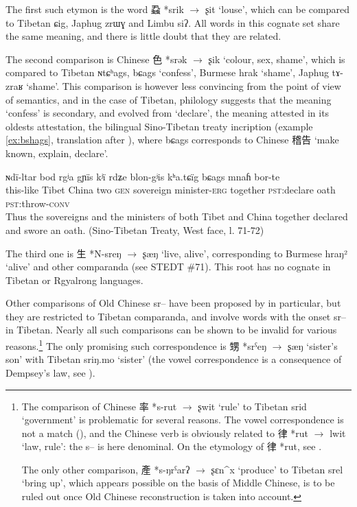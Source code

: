 \documentclass[oldfontcommands,oneside,a4paper,11pt]{article}
\newcommand{\ipa}[1]{{\phon #1}} %
\newcommand{\zh}[1]{{\cn #1}}
\newcommand{\archaic}[4]{\zh{#1} *\ipa{#2} $\rightarrow$ \ipa{#3} `#4'}
\begin{document}
The first such etymon is the word \archaic{蝨}{srik}{ʂit}{louse}, which can be compared to Tibetan \ipa{ɕig}, Japhug \ipa{zrɯɣ} and Limbu \ipa{siʔ}. All words in this cognate set share the same meaning, and there is little doubt that they are related.

The second comparison is Chinese \archaic{色}{srək}{ʂik}{colour, sex, shame}, which is compared to Tibetan \ipa{ɴtɕʰags}, \ipa{bɕags} `confess', Burmese \ipa{hrak} `shame', Japhug \ipa{tɤ-zraʁ} `shame'. This comparison is however less convincing from the point of view of semantics, and in the case of Tibetan, philology suggests that the meaning `confess' is secondary, and evolved from `declare', the meaning attested in its oldests attestation, the bilingual Sino-Tibetan treaty incription (example \ref{ex:bshags}, translation after \citealt[40,80]{licoblin87}), where 	\ipa{bɕags} corresponds to Chinese \zh{稽告} `make known, explain, declare'.


\begin{exe}
\ex \label{ex:bshags}
\gll
\ipa{ɴdï-ltar} 	\ipa{bod} 	\ipa{rgʲa} 	\ipa{gɲïs} 	\ipa{kʲï} 	\ipa{rdʑe} \ipa{blon-gʲis} 	\ipa{kʰa.tɕïg} 	\ipa{bɕags} 	\ipa{mnaɦ} 	\ipa{bor-te} \\
this-like Tibet China two \textsc{gen} sovereign minister-\textsc{erg} together \textsc{pst}:declare oath \textsc{pst}:throw-\textsc{conv} \\
\glt Thus the sovereigns and the ministers of both Tibet and China together declared and swore an oath. (Sino-Tibetan Treaty, West face, l. 71-72)
\end{exe}

The third one is \archaic{生}{N-sreŋ}{ʂæŋ}{live, alive}, corresponding to Burmese \ipa{hraŋ²} `alive' and other comparanda (see STEDT \#71). This root has no cognate in Tibetan or Rgyalrong languages.

Other comparisons of Old Chinese \ipa{*sr--} have been proposed by \citet{coblin86handlist} in particular, but they are restricted to Tibetan comparanda, and involve words with the onset \ipa{sr--} in Tibetan. Nearly all such comparisons can be shown to be invalid for various reasons.\footnote{The comparison of Chinese \archaic{率}{s-rut}{ʂwit}{rule} to Tibetan \ipa{srid} `government' is problematic for several reasons. The vowel correspondence is not a match (\citealt{gong95st}), and the Chinese verb is obviously related to \archaic{律}{rut}{lwit}{law, rule}: the \ipa{s--} is here denominal. On the etymology of \zh{律} *\ipa{rut}, see \citet{sagart14lv}.

The only other comparison, \archaic{產}{s-ŋrˁarʔ}{ʂɛn^x}{produce} to Tibetan \ipa{srel} `bring up', which appears possible on the basis of Middle Chinese, is to be ruled out once Old Chinese reconstruction is taken into account.
}
The only promising such correspondence is \archaic{甥}{srˁeŋ}{ʂæŋ}{sister's son} with Tibetan \ipa{sriŋ.mo} `sister' (the vowel correspondence is a consequence of Dempsey's law, see \citealt{hill14dempsey}).
\end{document}
